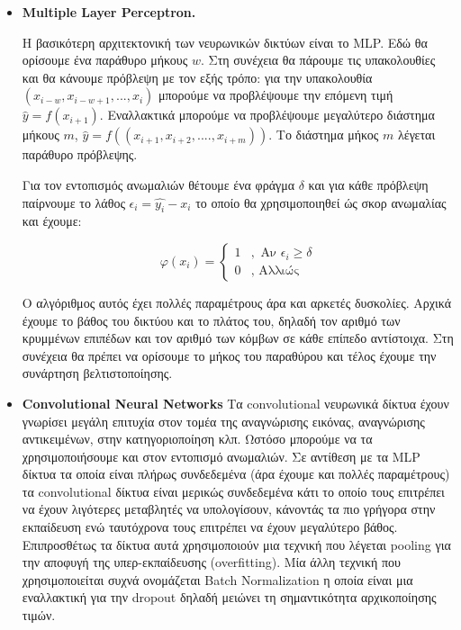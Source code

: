\documentclass[a4paper,12pt]{report}
\theoremstyle{definitionNODot}
\begin{document}
	\begin{itemize}
		\item \textbf{Multiple Layer Perceptron.}
		
		Η βασικότερη αρχιτεκτονική των νευρωνικών δικτύων είναι το MLP. Εδώ θα ορίσουμε ένα παράθυρο μήκους $w$. Στη συνέχεια θα πάρουμε τις υπακολουθίες και θα κάνουμε πρόβλεψη με τον εξής τρόπο: για την υπακολουθία $(x_{i-w}, x_{i-w+1}, ... , x_{i})$ μπορούμε να προβλέψουμε την επόμενη τιμή $\hat{y} = f(x_{i+1}) $. Εναλλακτικά μπορούμε να προβλέψουμε μεγαλύτερο διάστημα μήκους $m$, $\hat{y} = f((x_{i+1}, x_{i+2},....,x_{i+m}))$. Το διάστημα μήκος $m$ λέγεται παράθυρο πρόβλεψης.
		
		Για τον εντοπισμός ανωμαλιών θέτουμε ένα φράγμα $\delta$ και για κάθε πρόβλεψη παίρνουμε το λάθος $\epsilon_i = \hat{y_i} - x_i $ το οποίο θα χρησιμοποιηθεί ώς σκορ ανωμαλίας και έχουμε:
		
		\begin{equation*}
			\varphi(x_i) = \begin{cases}
				1 &,\text{ Αν } \epsilon_i\geq\delta\\
				0 &, \text{ Αλλιώς}
			\end{cases}
		\end{equation*}
		
		Ο αλγόριθμος αυτός έχει πολλές παραμέτρους άρα και αρκετές δυσκολίες. Αρχικά έχουμε το βάθος του δικτύου και το πλάτος του, δηλαδή τον αριθμό των κρυμμένων επιπέδων και τον αριθμό των κόμβων σε κάθε επίπεδο αντίστοιχα. Στη συνέχεια θα πρέπει να ορίσουμε το μήκος του παραθύρου και τέλος έχουμε την συνάρτηση βελτιστοποίησης.
		
		\item \textbf{Convolutional Neural Networks}
		Τα convolutional νευρωνικά δίκτυα έχουν γνωρίσει μεγάλη επιτυχία στον τομέα της αναγνώρισης εικόνας, αναγνώρισης αντικειμένων, στην κατηγοριοποίηση κλπ. Ωστόσο μπορούμε να τα χρησιμοποιήσουμε και στον εντοπισμό ανωμαλιών. Σε αντίθεση με τα MLP δίκτυα τα οποία είναι πλήρως συνδεδεμένα (άρα έχουμε και πολλές παραμέτρους) τα convolutional δίκτυα είναι μερικώς συνδεδεμένα κάτι το οποίο τους επιτρέπει να έχουν λιγότερες μεταβλητές να υπολογίσουν, κάνοντάς τα πιο γρήγορα στην εκπαίδευση ενώ ταυτόχρονα τους επιτρέπει να έχουν μεγαλύτερο βάθος. Επιπροσθέτως τα δίκτυα αυτά χρησιμοποιούν μια τεχνική που λέγεται pooling για την αποφυγή της υπερ-εκπαίδευσης (overfitting). Μία άλλη τεχνική που χρησιμοποιείται συχνά ονομάζεται Batch Normalization \cite{SergeyChristian2015BatchNormalization} η οποία είναι μια εναλλακτική για την dropout δηλαδή μειώνει τη σημαντικότητα αρχικοποίησης τιμών. 
		

\end{itemize}
\end{document}
